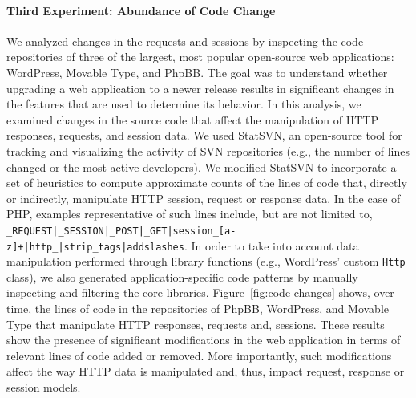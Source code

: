 \paragraph{Third Experiment: Abundance of Code Change}
\label{web:concept-drift:motivation:third}
We analyzed changes in the requests and sessions by inspecting the
code repositories of three of the largest, most popular open-source
web applications: \textsf{WordPress}, \textsf{Movable Type}, and
\textsf{PhpBB}. The goal was to understand whether upgrading a web
application to a newer release results in significant changes in the
features that are used to determine its behavior. In this analysis, we
examined changes in the source code that affect the manipulation of
\ac{HTTP} responses, requests, and session data. We used
\textsf{StatSVN}, an open-source tool for tracking and visualizing the
activity of \ac{SVN} repositories (e.g., the number of
lines changed or the most active developers). We modified
\textsf{StatSVN} to incorporate a set of heuristics to compute
approximate counts of the lines of code that, directly or indirectly,
manipulate \ac{HTTP} session, request or response data. In
the case of \ac{PHP}, examples representative of such lines
include, but are not limited to,
\texttt{\_REQUEST|\_SESSION|\_POST|\_GET|session\_[a-z]+|http\_|strip\_tags|addslashes}. In
order to take into account data manipulation performed through library
functions (e.g., \textsf{WordPress}' custom \texttt{Http} class), we
also generated application-specific code patterns by manually
inspecting and filtering the core
libraries. Figure~\ref{fig:code-changes} shows, over time, the lines
of code in the repositories of \textsf{PhpBB}, \textsf{WordPress}, and
\textsf{Movable Type} that manipulate \ac{HTTP} responses,
requests and, sessions. These results show the presence of significant
modifications in the web application in terms of relevant lines of
code added or removed. More importantly, such modifications affect the
way \ac{HTTP} data is manipulated and, thus, impact
request, response or session models.


